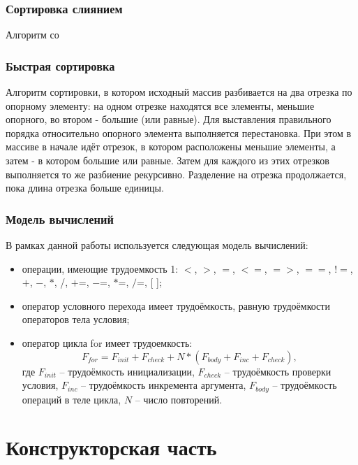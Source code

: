 \documentclass[12pt, a4paper]{report}
\begin{document}
	\subsection{Сортировка слиянием}
	Алгоритм со
		
	\subsection{Быстрая сортировка}
	Алгоритм сортировки, в котором исходный массив разбивается на два отрезка по опорному элементу: на одном отрезке находятся все элементы, меньшие опорного, во втором - большие (или равные). Для выставления правильного порядка относительно опорного элемента выполняется перестановка. При этом в массиве в начале идёт отрезок, в котором расположены меньшие элементы, а затем - в котором большие или равные. Затем для каждого из этих отрезков выполняется то же разбиение рекурсивно. Разделение на отрезка продолжается, пока длина отрезка больше единицы.
	
	\subsection{Модель вычислений}
	В рамках данной работы используется следующая модель вычислений:
	\begin{itemize}
		\item операции, имеющие трудоемкость 1: $<$, $>$, $=$, $<=$, $=>$, $==$, $!=$,$+$, $-$, $\ast$, /, $+$=, $-$=, $\ast$=, $/$=, [ ];
		\item оператор условного перехода имеет трудоёмкость, равную трудоёмкости операторов тела условия;
		\item оператор цикла for имеет трудоемкость:
		\begin{equation}
		\label{for_cost}
		F_{for} = F_{init} + F_{check} + N \ast (F_{body} + F_{inc} + F_{check}),
		\end{equation}
		где $F_{init}$ -- трудоёмкость инициализации, $F_{check}$ -- трудоёмкость проверки условия, $F_{inc}$ -- трудоёмкость инкремента аргумента, $F_{body}$ -- трудоёмкость операций в теле цикла, $N$ -- число повторений. ~\cite{AlgAnalysis}
	\end{itemize} 
	

	\chapter{Конструкторская часть}
	
\end{document}
